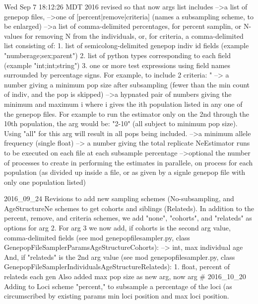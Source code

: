 \begin{DoxyVerb}
Wed Sep  7 18:12:26 MDT 2016
    revised so that now args list includes
    -->a list of genepop files, 
    -->one of [percent|remove|criteria] (names a subsampling scheme, to be enlarged)
    -->a list of comma-delimited percentages, for percent samplin, or N-values for removing N
from the individuals, or, for criteria, a comma-delimited list consisting of:
        1. list of semicolong-delimited genepop indiv id fields (example "numberage;sex;parent")
        2. list of python types corresponding to each field (example "int;int;string")
        3. one or more test expressions using field names 
            surrounded by percentage signs.  For example, to include 
            2 criteria: "%
    --> a number giving a minimum pop size 
       after subsampling (fewer than the min count of indiv, and the pop is skipped)
    -->a hypnated pair of numbers giving the minimum and maximum i where
i gives the ith population listed in any one of the genepop files. For
example to run the estimator only on the 2nd through the 10th population,
the arg would be: "2-10" (all subject to minimum pop size).  
Using "all" for this arg will result in all pops being included.
    -->a minimum allele frequency (single float)
    --> a number giving the total replicate NeEstimator runs 
to be executed on each file at each subsample percentage 
    -->optional the number of processes to create in performing the
estimates in parallele, on process for each population (as divided up inside a file,
or as given by a signle genepop file with only one population listed)

2016_09_24
    Revisions to add new sampling schemes (No-subsampling, and AgeStructureNe schemes to get
    cohorts and siblings (Relateds).  In addition to the percent, remove, and
    criteria schemes, we add "none", "cohorts", and "relateds" as options for arg 2.
    For arg 3 we now add, if cohorts is the second arg value, comma-delimited
    fields (see mod genepopfilesampler.py, class 
    GenepopFileSamplerParamsAgeStructureCohorts):
    --> int, max individual age
    And, if "relateds" is the 2nd arg value (see mod genepopfilesampler.py, class
    GenepopFileSamplerIndividualsAgeStructureRelateds):
    1. float, percent of relateds each gen
    Also added max pop size as new arg, now arg #
2016_10_20
    Adding to Loci scheme "percent," to subsample a percentage
    of the loci (as circumscribed by existing params min loci 
    position and max loci position.
\end{DoxyVerb}
 

